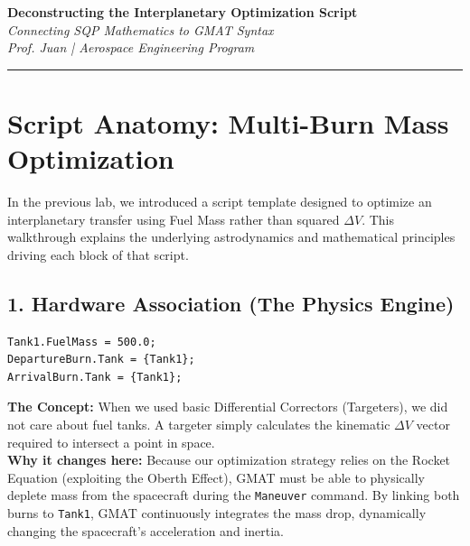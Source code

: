 \documentclass[11pt, letterpaper]{article}
\begin{document}
\begin{center}
    {\Large \textbf{Deconstructing the Interplanetary Optimization Script}} \\
    \vspace{0.2cm}
    {\large \textit{Connecting SQP Mathematics to GMAT Syntax}} \\
    \vspace{0.4cm}
    \textit{Prof. Juan | Aerospace Engineering Program}
\end{center}
\hrule
\vspace{0.5cm}

\section*{Script Anatomy: Multi-Burn Mass Optimization}
In the previous lab, we introduced a script template designed to optimize an interplanetary transfer using Fuel Mass rather than squared $\Delta V$. This walkthrough explains the underlying astrodynamics and mathematical principles driving each block of that script.

\subsection*{1. Hardware Association (The Physics Engine)}
\begin{lstlisting}[numbers=none]
Tank1.FuelMass = 500.0;
DepartureBurn.Tank = {Tank1};
ArrivalBurn.Tank = {Tank1};
\end{lstlisting}
\textbf{The Concept:} When we used basic Differential Correctors (Targeters), we did not care about fuel tanks. A targeter simply calculates the kinematic $\Delta V$ vector required to intersect a point in space. 
\\
\textbf{Why it changes here:} Because our optimization strategy relies on the Rocket Equation (exploiting the Oberth Effect), GMAT must be able to physically deplete mass from the spacecraft during the \texttt{Maneuver} command. By linking both burns to \texttt{Tank1}, GMAT continuously integrates the mass drop, dynamically changing the spacecraft's acceleration and inertia.

\end{document}
